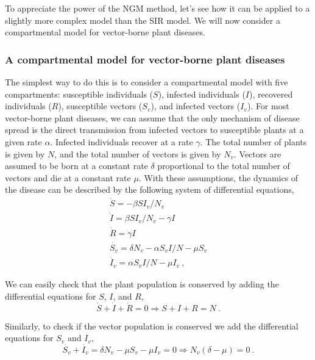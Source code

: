 To appreciate the power of the NGM method, let's see how it can be applied to a
slightly more complex model than the SIR model. We will now consider a
compartmental model for vector-borne plant diseases.

\subsubsection*{A compartmental model for vector-borne plant diseases}

The simplest way to do this is to consider a compartmental model with five
compartments: susceptible individuals ($S$), infected individuals ($I$),
recovered individuals ($R$), susceptible vectors ($S_v$), and infected vectors
($I_v$). For most vector-borne plant diseases, we can assume that the only
mechanism of disease spread is the direct transmission from infected vectors to
susceptible plants at a given rate $\alpha$. Infected individuals recover at
a rate $\gamma$. The total number of plants is given by $N$, and the total
number of vectors is given by $N_v$. Vectors are assumed to be born at a
constant rate $\delta$ proportional to the total number of vectors and die at a
constant rate $\mu$. With these assumptions, the dynamics of the disease can be
described by the following system of differential equations,
\begin{equation}\label{eq: SIRV_model}
  \begin{array}{l}
    \dot{S}=-\beta SI_v/N_v                       \\
    \dot{I}=\beta SI_v/N_v -\gamma I              \\
    \dot{R}=\gamma I                              \\
    \dot{S_v}=\delta N_v -\alpha S_vI/N - \mu S_v \\
    \dot{I_v}=\alpha S_vI/N-\mu I_v \ ,
  \end{array}
\end{equation}

We can easily check that the plant population is conserved by adding the
differential equations for $S$, $I$, and $R$,
\begin{equation}
  \dot{S}+\dot{I}+\dot{R}=0\Longrightarrow S+I+R=N \ .
\end{equation}

Similarly, to check if the vector population is conserved we add the
differential equations for $S_v$ and $I_v$,
\begin{equation}
  \dot{S_v}+\dot{I_v}=\delta N_v -\mu S_v -\mu I_v=0\Longrightarrow
  N_v(\delta-\mu)=0 \ .
\end{equation}

